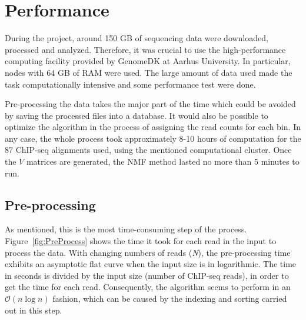 \section{Performance}

During the project, around 150 GB of sequencing data were downloaded, processed and analyzed. Therefore, it was crucial to use the high-performance computing facility provided by GenomeDK at Aarhus University. In particular, nodes with 64 GB of RAM were used. The large amount of data used made the task computationally intensive and some performance test were done.

\medskip

Pre-processing the data takes the major part of the time which could be avoided by saving the processed files into a database. It would also be possible to optimize the algorithm in the process of assigning the read counts for each bin. In any case, the whole process took approximately 8-10 hours of computation for the 87 ChIP-seq alignments used, using the mentioned computational cluster. Once the \(V\) matrices are generated, the NMF method lasted no more than 5 minutes to run.

\subsection{Pre-processing}

As mentioned, this is the most time-consuming step of the process. Figure~\ref{fig:PreProcess} shows the time it took for each read in the input to process the data. With changing numbers of reads (\textit{N}), the pre-processing time exhibits an asymptotic flat curve when the input size is in logarithmic. The time in seconds is divided by the input size (number of ChIP-seq reads), in order to get the time for each read. Consequently, the algorithm seems to perform in an \(\mathcal{O}(n \log{n})\) fashion, which can be caused by the indexing and sorting carried out in this step.

